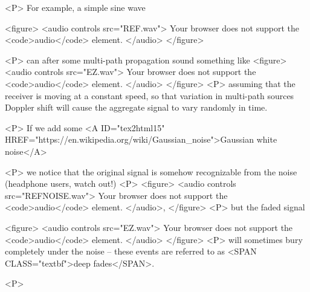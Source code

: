 <P>
  For example, a simple sine wave

  <figure>
    <audio
      controls
      src="REF.wav">
      Your browser does not support the
      <code>audio</code> element.
    </audio>
  </figure>
  
<P>
  can after some multi-path propagation sound something like
  <figure>
    <audio
      controls
      src="EZ.wav">
      Your browser does not support the
      <code>audio</code> element.
    </audio>
  </figure>
<P>
  assuming that the receiver is moving at a constant speed, so that variation in multi-path sources Doppler shift will cause the aggregate signal to vary randomly in time.

<P>
  If we add some <A ID="tex2html15"
		    HREF="https://en.wikipedia.org/wiki/Gaussian_noise">Gaussian white noise</A>

<P>
  we notice that the original signal is somehow recognizable from the noise (headphone users, watch out!)
<P>
  <figure>
    <audio
      controls
      src="REFNOISE.wav">
      Your browser does not support the
      <code>audio</code> element.
    </audio>,
  </figure>        
<P>
  but the faded signal

  <figure>
    <audio
      controls
      src="EZ.wav">
      Your browser does not support the
      <code>audio</code> element.
    </audio>
  </figure>        
<P>
will sometimes bury completely under the noise – these events are referred to as <SPAN  CLASS="textbf">deep fades</SPAN>.

<P>
